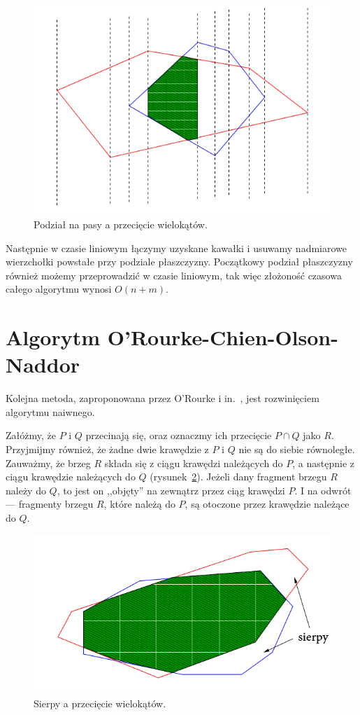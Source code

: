 \begin{figure}[htb]
  \centering
  \includegraphics[scale=0.5]{img/ShamosHoey76}
  \caption{Podział na pasy a przecięcie
    wielokątów.\label{img:ShamosHoey76}}
\end{figure}

Następnie w czasie liniowym łączymy uzyskane kawałki i usuwamy
nadmiarowe wierzchołki powstałe przy podziale płaszczyzny. Początkowy
podział płaszczyzny również możemy przeprowadzić w czasie liniowym,
tak więc złożoność czasowa całego algorytmu wynosi $O(n + m)$.

\section{Algorytm O'Rourke-Chien-Olson-Naddor}
Kolejna metoda, zaproponowana przez O'Rourke i in.~\cite{Orourke98},
jest rozwinięciem algorytmu naiwnego.

Załóżmy, że $P$ i $Q$ przecinają się, oraz oznaczmy ich przecięcie $P
\cap Q$ jako $R$. Przyjmijmy również, że żadne dwie krawędzie z $P$ i
$Q$ nie są do siebie równoległe. Zauważmy, że brzeg $R$ składa się z
ciągu krawędzi należących do $P$, a następnie z ciągu krawędzie
należących do $Q$ (rysunek~\ref{img:sickles}). Jeżeli dany fragment
brzegu $R$ należy do $Q$, to jest on ,,objęty'' na zewnątrz przez ciąg
krawędzi $P$. I na odwrót --- fragmenty brzegu $R$, które należą do
$P$, są otoczone przez krawędzie należące do $Q$.

\begin{figure}[htb]
  \centering
  \includegraphics[scale=0.5]{img/Orourke98}
  \caption{Sierpy a przecięcie wielokątów.\label{img:sickles}}
\end{figure}

